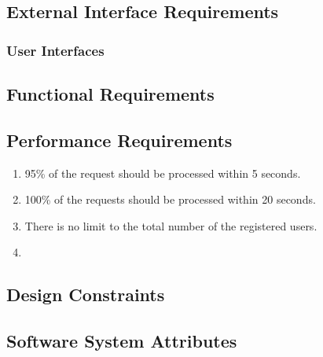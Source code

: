 \subsection{External Interface Requirements}
\subsubsection{User Interfaces}


\subsection{Functional Requirements}



\subsection{Performance Requirements}
\begin{enumerate}
\item
95\% of the request should be processed within 5 seconds.
\item
100\% of the requests should be processed within 20 seconds.
\item
There is no limit to the total number of the registered users.
\item

\end{enumerate}

\subsection{Design Constraints}

\subsection{Software System Attributes}
